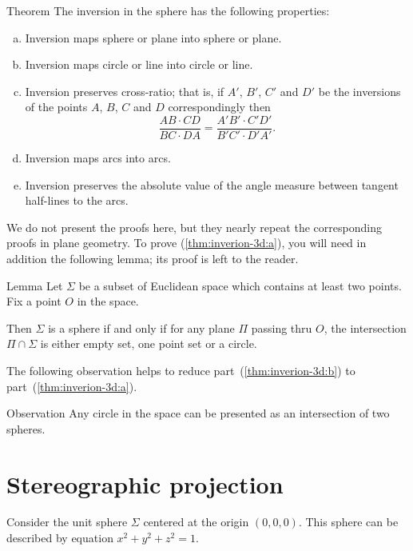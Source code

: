 \begin{thm}{Theorem}\label{thm:inverion-3d}
The inversion in the sphere has the following properties:
\begin{enumerate}[(a)]
\item\label{thm:inverion-3d:a} Inversion maps sphere or plane into sphere or plane.
\item\label{thm:inverion-3d:b} Inversion maps circle or line into circle or line. 
\item\label{thm:inverion-3d:cross-ratio} Inversion preserves cross-ratio; that is, if $A'$, $B'$, $C'$ and $D'$ be the inversions of the points $A$, $B$, $C$ and $D$ correspondingly 
then
$$\frac{AB\cdot CD}{BC\cdot DA}= \frac{A'B'\cdot C'D'}{B'C'\cdot D'A'}.$$
\item Inversion maps arcs into arcs.
\item\label{thm:inverion-3d:angle} Inversion preserves the absolute value of the angle
measure between tangent half-lines to the arcs.
\end{enumerate}
\end{thm}


We do not present the proofs here, but
they nearly repeat the corresponding proofs in plane geometry.
To prove (\ref{thm:inverion-3d:a}), you will need in addition the following lemma;
its proof is left to the reader.

\begin{thm}{Lemma}
Let $\Sigma$ be a subset of Euclidean space
which contains at least two points.
Fix a point $O$ in the space.

Then $\Sigma$ is 
a sphere 
if and only if
for any plane $\Pi$ passing thru $O$,
the intersection $\Pi\cap \Sigma$ is either empty set,
one point set or a circle.
\end{thm}  

The following observation helps to reduce part~(\ref{thm:inverion-3d:b}) to part~(\ref{thm:inverion-3d:a}).

\begin{thm}{Observation}
Any circle in the space can be presented as an intersection of two spheres.
\end{thm}


\section*{Stereographic projection}

Consider the unit sphere $\Sigma$ 
centered at the origin $(0,0,0)$.
This sphere can be described by equation $x^2+y^2+z^2=1$. 

